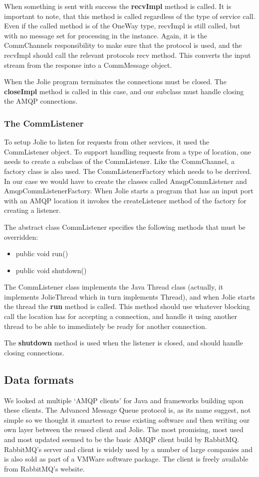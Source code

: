When something is sent with success the \textbf{recvImpl} method is called. It is important to note, that this method is called regardless of the type of service call. Even if the called method is of the OneWay type, recvImpl is still called, but with no message set for processing in the instance. Again, it is the CommChannels responsibility to make sure that the protocol is used, and the recvImpl should call the relevant protocols recv method. This converts the input stream from the response into a CommMessage object.

When the Jolie program terminates the connections must be closed. The \textbf{closeImpl} method is called in this case, and our subclass must handle closing the AMQP connections.

\subsubsection{The CommListener}
To setup Jolie to listen for requests from other services, it used the CommListener object. To support handling requests from a type of location, one needs to create a subclass of the CommListener. Like the CommChannel, a factory class is also used. The CommListenerFactory which needs to be derrived. In our case we would have to create the classes called AmqpCommListener and AmqpCommListenerFactory. When Jolie starts a program that has an input port with an AMQP location it invokes the createListener method of the factory for creating a listener.

The abstract class CommListener specifies the following methods that must be overridden:
\begin{itemize}
  \item public void run()
  \item public void shutdown()
\end{itemize}

The CommListener class implements the Java Thread class (actually, it implements JolieThread which in turn implements Thread), and when Jolie starts the thread the \textbf{run} method is called. This method should use whatever blocking call the location has for accepting a connection, and handle it using another thread to be able to immediately be ready for another connection.

The \textbf{shutdown} method is used when the listener is closed, and should handle closing connections.

\subsection{Data formats}
\label{subsec:Data formats}
We looked at multiple `AMQP clients' for Java and frameworks building upon these clients. The Advanced Message Queue protocol is, as its name suggest, not simple so we thought it smartest to reuse existing software and then writing our own layer between the reused client and Jolie. The most promising, most used and most updated seemed to be the basic AMQP client build by RabbitMQ\cite{RabbitMqClient}. RabbitMQ's server and client is widely used by a number of large companies and is also sold as part of a VMWare software package\cite{vFabric}. The client is freely available from RabbitMQ's website.

